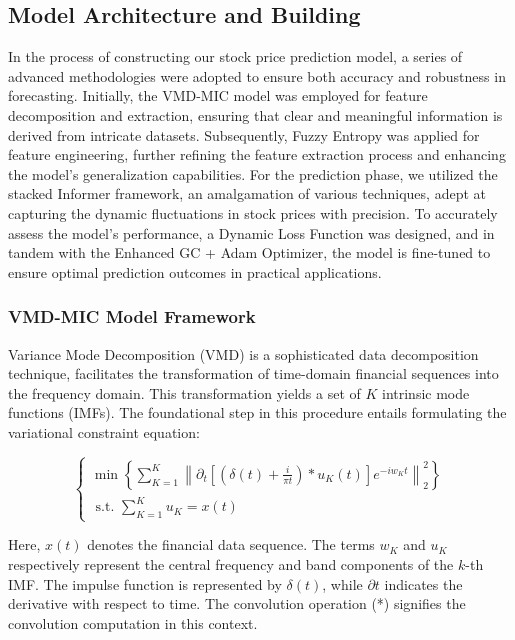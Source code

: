 \documentclass[sn-mathphys,Numbered]{sn-jnl}
\theoremstyle{thmstyleone}%
\theoremstyle{thmstyletwo}%
\theoremstyle{thmstylethree}%
\begin{document}
\subsection{Model Architecture and Building}\label{subsec2}
In the process of constructing our stock price prediction model, a series of advanced methodologies were adopted to ensure both accuracy and robustness in forecasting. Initially, the VMD-MIC model was employed for feature decomposition and extraction, ensuring that clear and meaningful information is derived from intricate datasets. Subsequently, Fuzzy Entropy was applied for feature engineering, further refining the feature extraction process and enhancing the model's generalization capabilities. For the prediction phase, we utilized the stacked Informer framework, an amalgamation of various techniques, adept at capturing the dynamic fluctuations in stock prices with precision. To accurately assess the model's performance, a Dynamic Loss Function was designed, and in tandem with the Enhanced GC + Adam Optimizer, the model is fine-tuned to ensure optimal prediction outcomes in practical applications.

\subsubsection{VMD-MIC Model Framework}\label{subsec1}

Variance Mode Decomposition (VMD) is a sophisticated data decomposition technique, facilitates the transformation of time-domain financial sequences into the frequency domain\cite{dragomiretskiy2013variational}. This transformation yields a set of \( K \) intrinsic mode functions (IMFs). The foundational step in this procedure entails formulating the variational constraint equation:

\begin{equation}
\left\{\begin{array}{l}
\min \left\{\sum_{K=1}^K\left\|\partial_t\left[\left(\delta(t)+\frac{i}{\pi t}\right) * u_K(t)\right] e^{-i w_K t}\right\|_2^2\right\} \\
\text { s.t. } \sum_{K=1}^K u_K=x(t)
\end{array}\right.
\end{equation}

Here, \( x(t) \) denotes the financial data sequence. The terms \( w_K \) and \( u_K \) respectively represent the central frequency and band components of the \( k \)-th IMF. The impulse function is represented by \( \delta(t) \), while \( \partial t \) indicates the derivative with respect to time. The convolution operation (*) signifies the convolution computation in this context.
\end{document}
